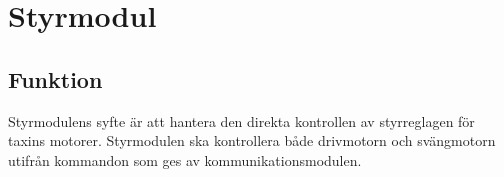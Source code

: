 \documentclass[designspec/spec.tex]{subfiles}
\begin{document}
\section{Styrmodul}

\subsection{Funktion}
Styrmodulens syfte är att hantera den direkta kontrollen av styrreglagen för
taxins motorer. Styrmodulen ska kontrollera både drivmotorn och svängmotorn
utifrån kommandon som ges av kommunikationsmodulen.
\end{document}
